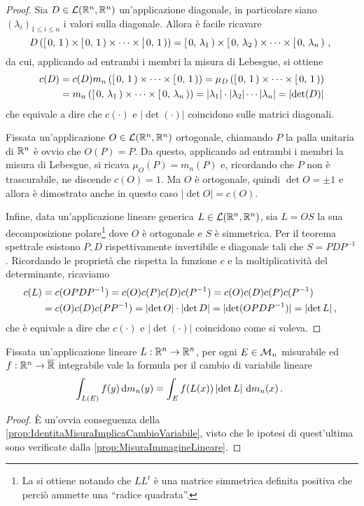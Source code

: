 \begin{proof}
	Sia $D\in\mathcal L(\mathbb R^n,\mathbb R^n)$ un'applicazione diagonale, in particolare siano $(\lambda_i)_{1\le i\le n}$ i valori sulla diagonale.
	Allora è facile ricavare
	\begin{equation*}
		D\left(\left[\,0,\,1\,\right)\times\left[\,0,\,1\,\right)\times\dots\times\left[\,0,\,1\,\right)\right)=\left[\,0,\,\lambda_1\,\right)\times\left[\,0,\,\lambda_2\,\right)\times\cdots\times\left[\,0,\,\lambda_n\,\right)\, \text{, }
	\end{equation*}
	da cui, applicando ad entrambi i membri la misura di Lebesgue, si ottiene
	\begin{align*}
		c(D)&=c(D)m_n\left(\left[\,0,\,1\,\right)\times\dots\times\left[\,0,\,1\,\right)\right)=\mu_D\left(\left[\,0,\,1\,\right)\times\dots\times\left[\,0,\,1\,\right)\right)\\
		&=m_n\left(\left[\,0,\,\lambda_1\,\right)\times\cdots\times\left[\,0,\,\lambda_n\,\right)\right)=
		\lvert\lambda_1\rvert\cdot\lvert\lambda_2\rvert\cdots\lvert\lambda_n\rvert=\lvert\det(D)\rvert
	\end{align*}
	che equivale a dire che $c(\cdot)$ e $\lvert\det(\cdot)\rvert$ coincidono sulle matrici diagonali.
	
	Fissata un'applicazione $O\in\mathcal L(\mathbb R^n,\mathbb R^n)$ ortogonale, chiamando $P$ la palla unitaria di $\mathbb R^n$ è ovvio che $O(P)=P$.
	Da questo, applicando ad entrambi i membri la misura di Lebesgue, si ricava $\mu_O(P)=m_n(P)$ e, ricordando che $P$ non è trascurabile, ne discende $c(O)=1$.
	Ma $O$ è ortogonale, quindi $\det O=\pm 1$ e allora è dimostrato anche in questo caso $\lvert\det O\rvert =c(O)$.
	
	Infine, data un'applicazione lineare generica $L\in\mathcal L(\mathbb R^n,\mathbb R^n)$, sia $L=OS$ la sua decomposizione polare\footnote{La si ottiene notando che $LL^t$ è una matrice simmetrica definita positiva che perciò ammette una ``radice quadrata''.} dove $O$ è ortogonale e $S$ è simmetrica. Per il teorema spettrale esistono $P,D$ rispettivamente invertibile e diagonale tali che $S=PDP^{-1}$.
	Ricordando le proprietà che rispetta la funzione $c$ e la moltiplicatività del determinante, ricaviamo
	\begin{align*}
		c(L)&=c(OPDP^{-1})=c(O)c(P)c(D)c(P^{-1})=c(O)c(D)c(P)c(P^{-1})\\
		&=c(O)c(D)c(PP^{-1})=\lvert\det O\rvert\cdot\lvert\det D\rvert=\lvert \det(OPDP^{-1})\rvert=\lvert\det L\rvert \, \text{, }
	\end{align*}
	che è equivale a dire che $c(\cdot)$ e $\lvert\det(\cdot)\rvert$ coincidono come si voleva.
\end{proof}

\begin{corollary}\label{cor:CambioVariabileLineare}
	Fissata un'applicazione lineare $L:\mathbb R^n\to\mathbb R^n$, per ogni $E\in\mathcal M_n$ misurabile ed $f:\mathbb R^n\to\overline{\mathbb R}$ integrabile vale la formula per il cambio di variabile lineare
	\begin{equation*}
		\int_{L(E)}f(y)\,\mathrm d m_n(y) = \int_E f(L(x))\left\lvert\det L\right\rvert \,\mathrm d m_n(x) \, \text{. }
	\end{equation*}
\end{corollary}
\begin{proof}
	È un'ovvia conseguenza della \cref{prop:IdentitaMisuraImplicaCambioVariabile}, visto che le ipotesi di quest'ultima sono verificate dalla \cref{prop:MisuraImmagineLineare}.
\end{proof}

